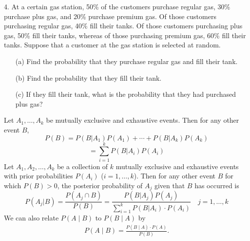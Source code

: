 \documentclass{report}
\begin{document}
    \pagebreak \bigbreak \noindent 
    \begin{mdframed}
        4. At a certain gas station, 50\% of the customers purchase regular gas, 30\% purchase plus gas, and 20\% purchase premium gas. Of those customers purchasing regular gas, 40\% fill their tanks. Of those customers purchasing plus gas, 50\% fill their tanks, whereas of those purchasing premium gas, 60\% fill their tanks. Suppose that a customer at the gas station is selected at random.
        \begin{itemize}
            \item[(a)] Find the probability that they purchase regular gas and fill their tank.
            \item[(b)] Find the probability that they fill their tank.
            \item[(c)] If they fill their tank, what is the probability that they had purchased plus gas?
        \end{itemize}
    \end{mdframed}
    \bigbreak \noindent 
    \begin{remark}
                    Let \( A_1, \ldots, A_k \) be mutually exclusive and exhaustive events. Then for any other event \( B \),
            \[
                P(B) = P(B|A_1)P(A_1) + \cdots + P(B|A_k)P(A_k)
            \]
            \[
                = \sum_{i=1}^{k} P(B|A_i)P(A_i) 
            \]
            \bigbreak \noindent 
            Let \( A_1, A_2, \ldots, A_k \) be a collection of \( k \) mutually exclusive and exhaustive events with prior probabilities \( P(A_i) \) (\( i = 1, \ldots, k \)). Then for any other event \( B \) for which \( P(B) > 0 \), the posterior probability of \( A_j \) given that \( B \) has occurred is
            \[
                P(A_j|B) = \frac{P(A_j \cap B)}{P(B)} = \frac{P(B|A_j)P(A_j)}{\sum_{i=1}^{k} P(B|A_i) \cdot P(A_i)} \quad j = 1, \ldots, k
            \]
            \bigbreak \noindent 
             We can also relate $P(A\mid B)$ to $P(B\mid A)$ by
            \begin{align*}
                P(A \mid B) = \frac{P(B\mid A) \cdot P(A)}{P(B)}
            .\end{align*}

    \end{remark}
    
\end{document}
